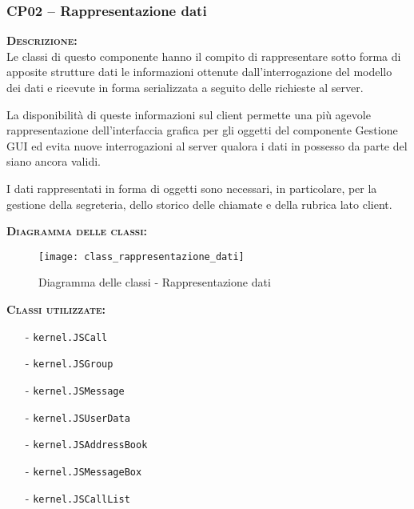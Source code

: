 \subsubsection{CP02 -- Rappresentazione dati}
\begin{description}
  \item{\scshape\bfseries Descrizione:}\\
Le classi di questo componente hanno il compito di rappresentare sotto forma di apposite strutture dati le informazioni ottenute dall'interrogazione del modello dei dati e ricevute in forma serializzata a seguito delle richieste al server.

La disponibilità di queste informazioni sul client permette una più agevole rappresentazione dell'interfaccia grafica per gli oggetti del componente \textsf{Gestione GUI} ed evita nuove interrogazioni al server qualora i dati in possesso da parte del  siano ancora validi.

I dati rappresentati in forma di oggetti sono necessari, in particolare, per la gestione della segreteria, dello storico delle chiamate e della rubrica lato client.

  \item{\scshape\bfseries Diagramma delle classi:}\\
  \begin{figure}[H]
    \centering
    \texttt{[image: class\_rappresentazione\_dati]}
    \caption{Diagramma delle classi - Rappresentazione dati}\label{fig:rappresentazionedati}
  \end{figure}

	\item{\scshape\bfseries Classi utilizzate:} 
	\begin{itemize}[noitemsep,nolistsep]
		\item[-] \texttt{kernel.JSCall}
		\item[-] \texttt{kernel.JSGroup}
		\item[-] \texttt{kernel.JSMessage}
		\item[-] \texttt{kernel.JSUserData}
		\item[-] \texttt{kernel.JSAddressBook}
		\item[-] \texttt{kernel.JSMessageBox}
    \item[-] \texttt{kernel.JSCallList}
	\end{itemize}  
\end{description}

